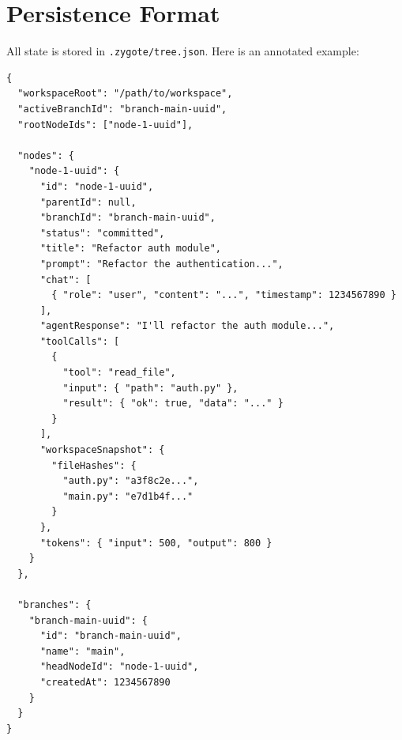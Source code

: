 \documentclass[12pt, a4paper]{article}
\begin{document}
\begin{center}
\end{center}

\newpage

\section{Persistence Format}

All state is stored in \texttt{.zygote/tree.json}. Here is an annotated example:

\begin{lstlisting}
{
  "workspaceRoot": "/path/to/workspace",
  "activeBranchId": "branch-main-uuid",
  "rootNodeIds": ["node-1-uuid"],

  "nodes": {
    "node-1-uuid": {
      "id": "node-1-uuid",
      "parentId": null,
      "branchId": "branch-main-uuid",
      "status": "committed",
      "title": "Refactor auth module",
      "prompt": "Refactor the authentication...",
      "chat": [
        { "role": "user", "content": "...", "timestamp": 1234567890 }
      ],
      "agentResponse": "I'll refactor the auth module...",
      "toolCalls": [
        {
          "tool": "read_file",
          "input": { "path": "auth.py" },
          "result": { "ok": true, "data": "..." }
        }
      ],
      "workspaceSnapshot": {
        "fileHashes": {
          "auth.py": "a3f8c2e...",
          "main.py": "e7d1b4f..."
        }
      },
      "tokens": { "input": 500, "output": 800 }
    }
  },

  "branches": {
    "branch-main-uuid": {
      "id": "branch-main-uuid",
      "name": "main",
      "headNodeId": "node-1-uuid",
      "createdAt": 1234567890
    }
  }
}
\end{lstlisting}
\end{document}
